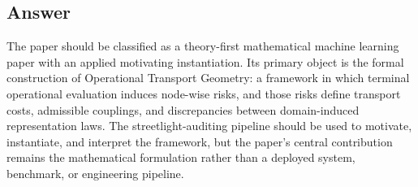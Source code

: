 \documentclass[11pt,a4paper]{article}
\begin{document}
\subsection*{Answer}

The paper should be classified as a theory-first mathematical machine learning paper with an applied motivating instantiation. Its primary object is the formal construction of Operational Transport Geometry: a framework in which terminal operational evaluation induces node-wise risks, and those risks define transport costs, admissible couplings, and discrepancies between domain-induced representation laws. The streetlight-auditing pipeline should be used to motivate, instantiate, and interpret the framework, but the paper's central contribution remains the mathematical formulation rather than a deployed system, benchmark, or engineering pipeline.
\end{document}
